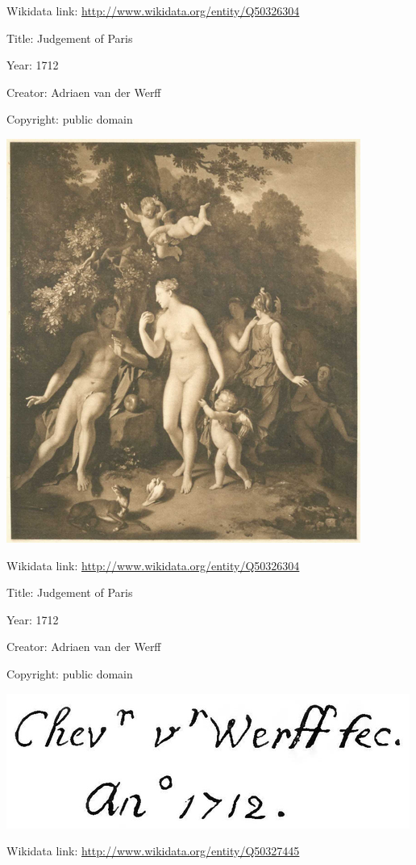 \documentclass[
  letterpaper,
]{book}
\begin{document}
Wikidata link: \url{http://www.wikidata.org/entity/Q50326304}

Title: Judgement of Paris

Year: 1712

Creator: Adriaen van der Werff

Copyright: public domain

\includegraphics{paintings_files/figure-pdf/cell-2-output-12.png}

Wikidata link: \url{http://www.wikidata.org/entity/Q50326304}

Title: Judgement of Paris

Year: 1712

Creator: Adriaen van der Werff

Copyright: public domain

\includegraphics{paintings_files/figure-pdf/cell-2-output-14.png}

Wikidata link: \url{http://www.wikidata.org/entity/Q50327445}
\end{document}
